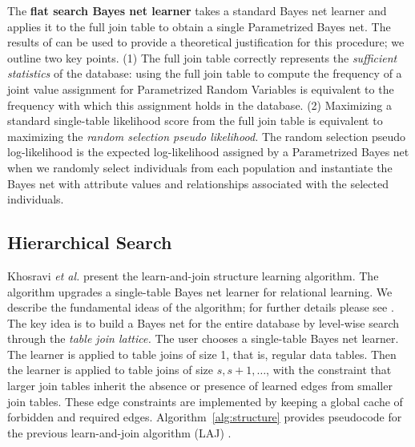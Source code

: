 \documentclass{article}
\begin{document}
The \textbf{flat search Bayes net learner} takes a standard Bayes net learner and applies it to the full join table to obtain a single Parametrized Bayes net.
 The results of \cite{Schulte2011} can be used to provide a theoretical justification for this procedure;
 we outline two key points. (1) The full join table correctly represents the {\em sufficient statistics}\cite{Heckerman1995,Schulte2011} of the database: 
using the full join table to compute the frequency of a joint value assignment for Parametrized Random Variables is equivalent to the frequency with which this assignment holds in the database. 
(2) Maximizing a standard single-table likelihood score from the full join table is equivalent to maximizing the {\em random selection pseudo likelihood.} 
The random selection pseudo log-likelihood is the expected log-likelihood assigned by a Parametrized Bayes net when we randomly select individuals from each population and instantiate the Bayes net with attribute values and relationships associated with the selected individuals. 

\subsection{Hierarchical Search}
Khosravi {\em et al.} \cite{Schulte2012} present the learn-and-join  structure learning algorithm. 
The algorithm upgrades a single-table Bayes net learner for relational learning. 
We describe the fundamental ideas of the algorithm; for further details please see \cite{Schulte2012}. 
The key idea is to build a Bayes net for the entire database by level-wise search through the {\em table join lattice.} The user chooses a single-table Bayes net learner. The learner is applied to table joins of size 1, that is, regular data tables. Then the learner is applied to table joins of size $s,s+1,\ldots$, with the constraint that larger join tables inherit the absence or presence of learned edges from smaller join tables. These edge constraints are implemented by keeping a global cache of forbidden and required edges.  Algorithm~\ref{alg:structure} provides pseudocode for the previous learn-and-join algorithm (LAJ) \cite{Schulte2012c}. 
\end{document}
